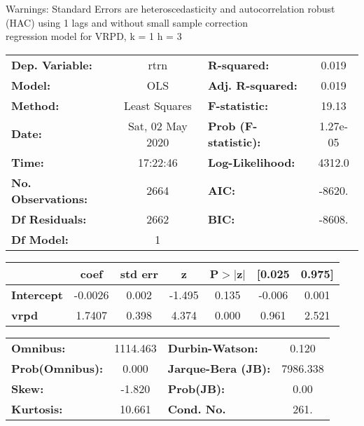 Warnings: \newline
 [1] Standard Errors are heteroscedasticity and autocorrelation robust (HAC) using 1 lags and without small sample correction\\ 

regression model for VRPD, k = 1 h = 3\begin{center}
\begin{tabular}{lclc}
\toprule
\textbf{Dep. Variable:}    &       rtrn       & \textbf{  R-squared:         } &     0.019   \\
\textbf{Model:}            &       OLS        & \textbf{  Adj. R-squared:    } &     0.019   \\
\textbf{Method:}           &  Least Squares   & \textbf{  F-statistic:       } &     19.13   \\
\textbf{Date:}             & Sat, 02 May 2020 & \textbf{  Prob (F-statistic):} &  1.27e-05   \\
\textbf{Time:}             &     17:22:46     & \textbf{  Log-Likelihood:    } &    4312.0   \\
\textbf{No. Observations:} &        2664      & \textbf{  AIC:               } &    -8620.   \\
\textbf{Df Residuals:}     &        2662      & \textbf{  BIC:               } &    -8608.   \\
\textbf{Df Model:}         &           1      & \textbf{                     } &             \\
\bottomrule
\end{tabular}
\begin{tabular}{lcccccc}
                   & \textbf{coef} & \textbf{std err} & \textbf{z} & \textbf{P$> |$z$|$} & \textbf{[0.025} & \textbf{0.975]}  \\
\midrule
\textbf{Intercept} &      -0.0026  &        0.002     &    -1.495  &         0.135        &       -0.006    &        0.001     \\
\textbf{vrpd}      &       1.7407  &        0.398     &     4.374  &         0.000        &        0.961    &        2.521     \\
\bottomrule
\end{tabular}
\begin{tabular}{lclc}
\textbf{Omnibus:}       & 1114.463 & \textbf{  Durbin-Watson:     } &    0.120  \\
\textbf{Prob(Omnibus):} &   0.000  & \textbf{  Jarque-Bera (JB):  } & 7986.338  \\
\textbf{Skew:}          &  -1.820  & \textbf{  Prob(JB):          } &     0.00  \\
\textbf{Kurtosis:}      &  10.661  & \textbf{  Cond. No.          } &     261.  \\
\bottomrule
\end{tabular}
\end{center}

